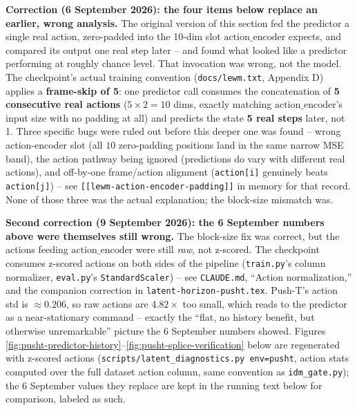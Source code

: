 \documentclass[11pt]{article}
\begin{document}
\textbf{Correction (6 September 2026): the four items below replace an earlier, wrong
analysis.} The original version of this section fed the predictor a single real action,
zero-padded into the 10-dim slot $\mathrm{action\_encoder}$ expects, and compared its output
one real step later -- and found what looked like a predictor performing at roughly chance
level. That invocation was wrong, not the model. The checkpoint's actual training convention
(\texttt{docs/lewm.txt}, Appendix D) applies a \textbf{frame-skip of 5}: one predictor call
consumes the concatenation of \textbf{5 consecutive real actions} ($5\times2{=}10$ dims,
exactly matching $\mathrm{action\_encoder}$'s input size with no padding at all) and
predicts the state \textbf{5 real steps} later, not 1. Three specific bugs were ruled out
before this deeper one was found -- wrong action-encoder slot (all $10$ zero-padding
positions land in the same narrow MSE band), the action pathway being ignored (predictions
do vary with different real actions), and off-by-one frame/action alignment
(\texttt{action[i]} genuinely beats \texttt{action[j]}) -- see
\texttt{[[lewm-action-encoder-padding]]} in memory for that record. None of those three was
the actual explanation; the block-size mismatch was.

\textbf{Second correction (9 September 2026): the 6 September numbers above were themselves
still wrong.} The block-size fix was correct, but the actions feeding
$\mathrm{action\_encoder}$ were still \emph{raw}, not z-scored. The checkpoint consumes
z-scored actions on both sides of the pipeline (\texttt{train.py}'s column normalizer,
\texttt{eval.py}'s \texttt{StandardScaler}) -- see \texttt{CLAUDE.md}, ``Action
normalization,'' and the companion correction in \texttt{latent-horizon-pusht.tex}. Push-T's
action std is $\approx 0.206$, so raw actions are $\mathbf{4.82\times}$ too small, which
reads to the predictor as a near-stationary command -- exactly the ``flat, no history
benefit, but otherwise unremarkable'' picture the 6 September numbers showed. Figures
\ref{fig:pusht-predictor-history}--\ref{fig:pusht-splice-verification} below are regenerated
with z-scored actions (\texttt{scripts/latent\_diagnostics.py env=pusht}, action stats
computed over the full dataset action column, same convention as \texttt{idm\_gate.py}); the
6 September values they replace are kept in the running text below for comparison, labeled
as such.
\end{document}
